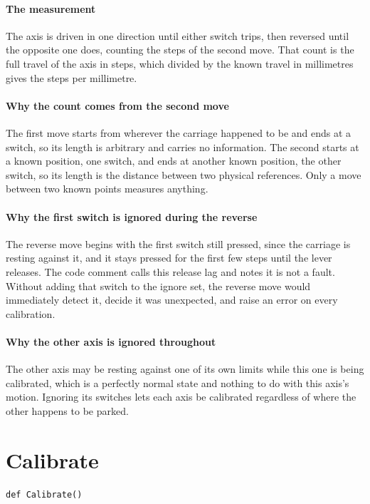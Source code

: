 \paragraph{The measurement}
The axis is driven in one direction until either switch trips, then reversed until the opposite one does, counting the steps of the second move. That count is the full travel of the axis in steps, which divided by the known travel in millimetres gives the steps per millimetre.


\paragraph{Why the count comes from the second move}
The first move starts from wherever the carriage happened to be and ends at a switch, so its length is arbitrary and carries no information. The second starts at a known position, one switch, and ends at another known position, the other switch, so its length is the distance between two physical references. Only a move between two known points measures anything.


\paragraph{Why the first switch is ignored during the reverse}
The reverse move begins with the first switch still pressed, since the carriage is resting against it, and it stays pressed for the first few steps until the lever releases. The code comment calls this release lag and notes it is not a fault. Without adding that switch to the ignore set, the reverse move would immediately detect it, decide it was unexpected, and raise an error on every calibration.


\paragraph{Why the other axis is ignored throughout}
The other axis may be resting against one of its own limits while this one is being calibrated, which is a perfectly normal state and nothing to do with this axis's motion. Ignoring its switches lets each axis be calibrated regardless of where the other happens to be parked.


\section{Calibrate}
\begin{lstlisting}[style=sig]
def Calibrate()
\end{lstlisting}

